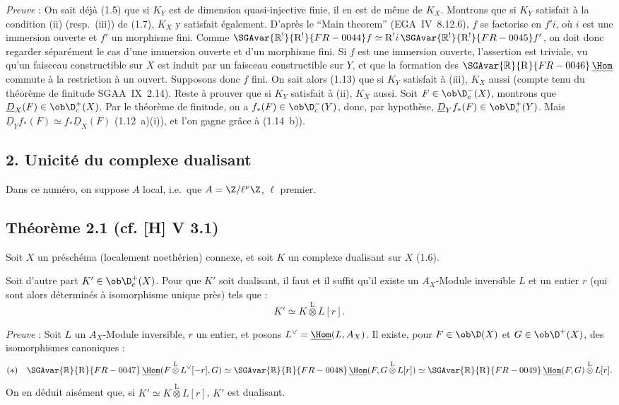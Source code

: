 \emph{Preuve} : On sait déjà (1.5) que si $K_Y$ est de dimension quasi-injective finie, il en est de même de $K_X$. Montrons que si $K_Y$ satisfait à la condition (ii) (resp.~(iii)) de (1.7), $K_X$ y satisfait également. D'après le ``Main theorem'' (EGA~IV~8.12.6), $f$ se factorise en $f'i$, où $i$ est une immersion ouverte et $f'$ un morphisme fini. Comme $\SGAvar{\mathbb{R}^{!}}{\mathrm{R}^{!}}{FR-0044}f \simeq \mathrm{R}^{!}i \, \SGAvar{\mathbb{R}^{!}}{\mathrm{R}^{!}}{FR-0045}f'$, on doit donc regarder séparément le cas d'une immersion ouverte et d'un morphisme fini. Si $f$ est une immersion ouverte, l'assertion est triviale, vu qu'un faisceau constructible sur $X$ est induit par un faisceau constructible sur $Y$, et que la formation des $\SGAvar{\mathbb{R}}{\mathrm{R}}{FR-0046}\,\underline{\Hom}$ commute à la restriction à un ouvert. Supposons donc $f$ fini. On sait alors (1.13) que si $K_Y$ satisfait à (iii), $K_X$ aussi (compte tenu du théorème de finitude SGAA~IX~2.14). Reste à prouver que si $K_Y$ satisfait à (ii), $K_X$ aussi. Soit $F \in \ob \D_c^{-}(X)$, montrons que $\underline{D}_X(F) \in \ob \D_c^{+}(X)$. Par le théorème de finitude, on a $f_{*}(F) \in \ob \D_c^{-}(Y)$, donc, par hypothèse, $\underline{D}_Y f_{*}(F) \in \ob \D_c^{+}(Y)$. Mais $\underline{D}_Y f_{*}(F) \simeq f_{*}\underline{D}_X(F)$ (1.12~a)(i)), et l'on gagne grâce à (1.14~b)).

\subsection*{2. Unicité du complexe dualisant}

Dans ce numéro, on suppose $A$ local, i.e.~que $A = \Z/\ell^{\nu}\Z$, $\ell$ premier.

\subsection*{Théorème 2.1 (cf. [H] V 3.1)}
Soit $X$ un préschéma (localement noethérien) connexe, et soit $K$ un complexe dualisant sur $X$ (1.6).

Soit d'autre part $K' \in \ob \D_c^{+}(X)$. Pour que $K'$ soit dualisant, il faut et il suffit qu'il existe un $A_X$-Module inversible $L$ et un entier $r$ (qui sont 
alors
déterminés à isomorphisme unique près) tels que :
\[
K' \simeq K \mathop{\otimes}\limits^{\mathrm{L}} L[r].
\]

\emph{Preuve} : Soit $L$ un $A_X$-Module inversible, $r$ un entier, et posons $L^{\vee} = \underline{\Hom}(L, A_X)$. Il existe, pour $F \in \ob \D(X)$ et $G \in \ob \D^{+}(X)$, des isomorphismes canoniques :
\[
(*) \quad \SGAvar{\mathbb{R}}{\mathrm{R}}{FR-0047}\,\underline{\Hom}(F \mathop{\otimes}\limits^{\mathrm{L}} L^{\vee}[-r], G) \simeq \SGAvar{\mathbb{R}}{\mathrm{R}}{FR-0048}\,\underline{\Hom}(F, G \mathop{\otimes}\limits^{\mathrm{L}} L[r]) \simeq \SGAvar{\mathbb{R}}{\mathrm{R}}{FR-0049}\,\underline{\Hom}(F,G) \mathop{\otimes}\limits^{\mathrm{L}} L[r].
\]
On en déduit aisément que, si $K' \simeq K \mathop{\otimes}\limits^{\mathrm{L}} L[r]$, $K'$ est dualisant.

